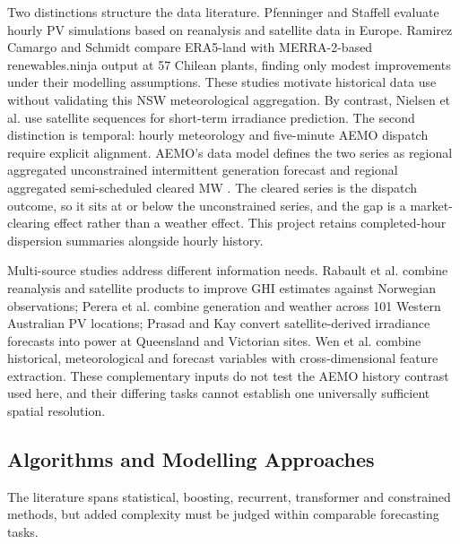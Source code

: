 Two distinctions structure the data literature. Pfenninger and Staffell \cite{pfenninger2016longterm} evaluate hourly PV simulations based on reanalysis and satellite data in Europe. Ramirez Camargo and Schmidt \cite{ramirez2020simulation} compare ERA5-land with MERRA-2-based renewables.ninja output at 57 Chilean plants, finding only modest improvements under their modelling assumptions. These studies motivate historical data use without validating this NSW meteorological aggregation. By contrast, Nielsen et al. \cite{nielsen2021irradiancenet} use satellite sequences for short-term irradiance prediction. The second distinction is temporal: hourly meteorology \cite{renewables2025api} and five-minute AEMO dispatch \cite{aemo2024nemosis} require explicit alignment. AEMO's data model defines the two series as regional aggregated unconstrained intermittent generation forecast and regional aggregated semi-scheduled cleared MW \cite{aemo2026datamodel}. The cleared series is the dispatch outcome, so it sits at or below the unconstrained series, and the gap is a market-clearing effect rather than a weather effect. This project retains completed-hour dispersion summaries alongside hourly history.

Multi-source studies address different information needs. Rabault et al. \cite{rabault2025datafusion} combine reanalysis and satellite products to improve GHI estimates against Norwegian observations; Perera et al. \cite{perera2024dayahead} combine generation and weather across 101 Western Australian PV locations; Prasad and Kay \cite{prasad2021prediction} convert satellite-derived irradiance forecasts into power at Queensland and Victorian sites. Wen et al. \cite{wen2026multisource} combine historical, meteorological and forecast variables with cross-dimensional feature extraction. These complementary inputs do not test the AEMO history contrast used here, and their differing tasks cannot establish one universally sufficient spatial resolution.

\subsection{Algorithms and Modelling Approaches}

The literature spans statistical, boosting, recurrent, transformer and constrained methods, but added complexity must be judged within comparable forecasting tasks.

